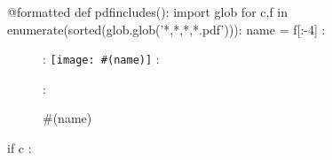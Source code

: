 {%
@formatted
def pdfincludes():
    import glob
    for c,f in enumerate(sorted(glob.glob('*,*,*,*.pdf'))):
        name = f[:-4]
        : \begin{figure}[p]
        : \texttt{[image: \#(name)]}
        : \caption{#(name)}
        : \end{figure}
        if c%
            : \clearpage
}%

\documentclass[a4]{article}
\usepackage{graphicx}



\pdfincludes


